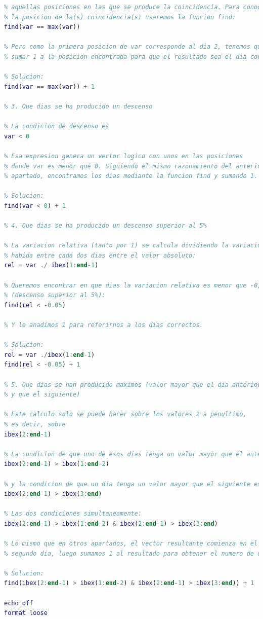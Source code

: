 \begin{lstlisting}[language=Matlab]
% Asi obtenemos un vector de valores logicos, con 1 (verdadero) en
% aquellas posiciones en las que se produce la coincidencia. Para conocer
% la posicion de la(s) coincidencia(s) usaremos la funcion find:
find(var == max(var))

% Pero como la primera posicion de var corresponde al dia 2, tenemos que
% sumar 1 a la posicion encontrada para que el resultado sea el dia correcto.

% Solucion:
find(var == max(var)) + 1

% 3. Que dias se ha producido un descenso

% La condicion de descenso es
var < 0

% Esa expresion genera un vector logico con unos en las posiciones
% donde var es menor que 0. Siguiendo el mismo razonamiento del anterior
% apartado, encontramos los dias mediante la funcion find y sumando 1.

% Solucion:
find(var < 0) + 1

% 4. Que dias se ha producido un descenso superior al 5%

% La variacion relativa (tanto por 1) se calcula dividiendo la variacion
% habida entre cada dos dias entre el valor absoluto:
rel = var ./ ibex(1:end-1)

% Queremos encontrar en que dias la variacion relativa es menor que -0,05
% (descenso superior al 5%):
find(rel < -0.05)

% Y le anadimos 1 para referirnos a los dias correctos.

% Solucion:
rel = var ./ibex(1:end-1)
find(rel < -0.05) + 1

% 5. Que dias se han producido maximos (valor mayor que el dia anterior
% y que el siguiente)

% Este calculo solo se puede hacer sobre los valores 2 a penultimo,
% es decir, sobre
ibex(2:end-1)

% La condicion de que uno de esos dias tenga un valor mayor que el anterior es
ibex(2:end-1) > ibex(1:end-2)

% y la condicion de que un dia tenga un valor mayor que el siguiente es
ibex(2:end-1) > ibex(3:end)

% Las dos condiciones simultaneamente:
ibex(2:end-1) > ibex(1:end-2) & ibex(2:end-1) > ibex(3:end)

% Lo mismo que en otros apartados, el vector resultante comienza en el
% segundo dia, luego sumamos 1 al resultado para obtener el numero de dia correcto.

% Solucion:
find(ibex(2:end-1) > ibex(1:end-2) & ibex(2:end-1) > ibex(3:end)) + 1

echo off
format loose
\end{lstlisting}



